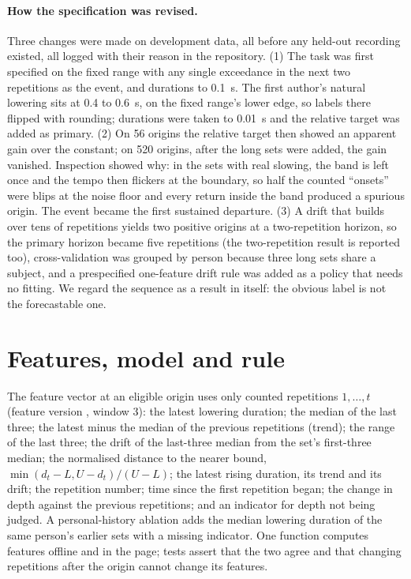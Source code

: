 \documentclass[11pt,a4paper]{article}
\begin{document}
\paragraph{How the specification was revised.} Three changes were made on development data, all before any held-out recording existed, all logged with their reason in the repository. (1) The task was first specified on the fixed range with any single exceedance in the next two repetitions as the event, and durations to 0.1~s. The first author's natural lowering sits at 0.4 to 0.6~s, on the fixed range's lower edge, so labels there flipped with rounding; durations were taken to 0.01~s and the relative target was added as primary. (2) On 56 origins the relative target then showed an apparent gain over the constant; on 520 origins, after the long sets were added, the gain vanished. Inspection showed why: in the sets with real slowing, the band is left once and the tempo then flickers at the boundary, so half the counted ``onsets'' were blips at the noise floor and every return inside the band produced a spurious origin. The event became the first sustained departure. (3) A drift that builds over tens of repetitions yields two positive origins at a two-repetition horizon, so the primary horizon became five repetitions (the two-repetition result is reported too), cross-validation was grouped by person because three long sets share a subject, and a prespecified one-feature drift rule was added as a policy that needs no fitting. We regard the sequence as a result in itself: the obvious label is not the forecastable one.

\section{Features, model and rule}

The feature vector at an eligible origin uses only counted repetitions $1,\dots,t$ (feature version \FeatureVersion, window 3): the latest lowering duration; the median of the last three; the latest minus the median of the previous repetitions (trend); the range of the last three; the drift of the last-three median from the set's first-three median; the normalised distance to the nearer bound, $\min(d_t - L, U - d_t)/(U-L)$; the latest rising duration, its trend and its drift; the repetition number; time since the first repetition began; the change in depth against the previous repetitions; and an indicator for depth not being judged. A personal-history ablation adds the median lowering duration of the same person's earlier sets with a missing indicator. One function computes features offline and in the page; tests assert that the two agree and that changing repetitions after the origin cannot change its features.
\end{document}
